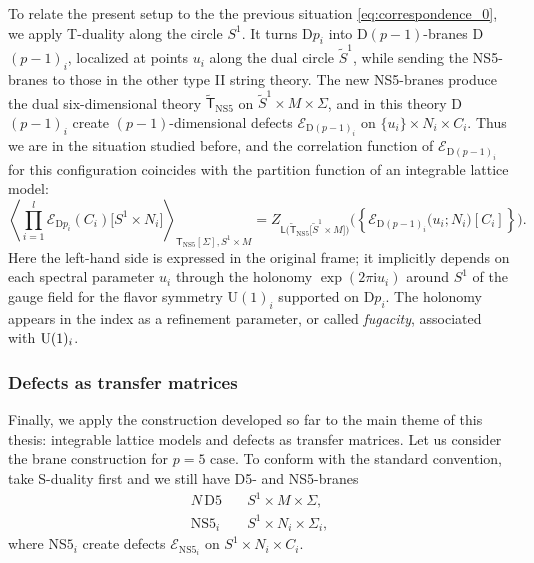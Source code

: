 To relate the present setup to the the previous situation \eqref{eq:correspondence_0},
we apply T-duality along the circle $S^{1}$. It turns D$p_{i}$
into D$(p-1)$-branes D$(p-1)_{i}$, localized
at points $u_{i}$ along the dual circle $\tilde{S}^{1}$, while sending
the NS5-branes to those in the other type II string theory. The new
NS5-branes produce the dual six-dimensional theory $\tilde{\mathsf{T}}_{\mathrm{NS5}}$
on $\tilde{S}^{1}\times M\times\Sigma$, and in this theory D$(p-1)_{i}$
create $(p-1)$-dimensional defects $\mathcal{E}_{\mathrm{D}(p-1)_{i}}$
on $\{ u_{i}\} \times N_{i}\times C_{i}$. Thus we are
in the situation studied before, and the correlation function of $\mathcal{E}_{\mathrm{D}(p-1)_{i}}$
for this configuration coincides with the partition function
of an integrable lattice model:
\begin{equation}
  \left\langle
    \prod_{i=1}^l \mathcal{E}_{\mathrm{D}p_i}(C_i) \big[S^1 \times N_i\big]
      \right\rangle_{\mathsf{T}_{\mathrm{NS5}}[\Sigma],S^{1}\times M}
    =
      Z_{\mathsf{L}\big(\tilde{\mathsf{T}}_{\mathrm{NS5}}\big[\tilde{S}^{1}\times M\big]\big)}
      \big( \left\{ \mathcal{E}_{\mathrm{D}(p-1)_i} \big(u_i; N_i\big) [C_i]\right\} \big).
\end{equation}
Here the left-hand side is expressed in the original frame; it implicitly
depends on each spectral parameter $u_{i}$ through the holonomy $\exp(2\pi\mathrm{i}u_{i})$
around $S^{1}$ of the gauge field for the flavor symmetry U$(1)_{i}$
supported on D$p_{i}$. The holonomy appears in the index as a refinement
parameter, or called \emph{fugacity}, associated with $\mathrm{U}(1)_i$.





\subsubsection{Defects as transfer matrices}
\label{sec:defects}

Finally, we apply the construction developed so far
to the main theme of this thesis: integrable lattice models and defects
as transfer matrices. Let us consider the brane construction for $p=5$ case.
To conform with the standard convention, take
S-duality first and we still have D5- and NS5-branes
\begin{align*}
  N  \,  \mathrm{D5}   &  \quad S^{1}  \times  M  \times  \Sigma,  \\
  \mathrm{NS5}_{i}    &  \quad S^{1}  \times  N_{i}  \times  \Sigma_{i},
\end{align*}
where NS$5_{i}$ create defects $\mathcal{E}_{\mathrm{NS}5_{i}}$
on $S^{1}\times N_{i}\times C_{i}$.

